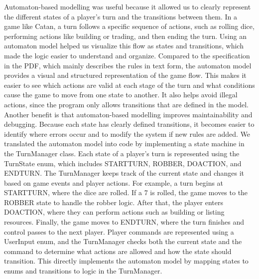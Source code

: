 Automaton-based modelling was useful because it allowed us to clearly represent the different states of a player’s turn and the transitions between them. In a game like Catan, a turn follows a specific sequence of actions, such as rolling dice, performing actions like building or trading, and then ending the turn. Using an automaton model helped us visualize this flow as states and transitions, which made the logic easier to understand and organize. Compared to the specification in the PDF, which mainly describes the rules in text form, the automaton model provides a visual and structured representation of the game flow. This makes it easier to see which actions are valid at each stage of the turn and what conditions cause the game to move from one state to another. It also helps avoid illegal actions, since the program only allows transitions that are defined in the model. \newline
\newline
Another benefit is that automaton-based modelling improves maintainability and debugging. Because each state has clearly defined transitions, it becomes easier to identify where errors occur and to modify the system if new rules are added. \newline
\newline
We translated the automaton model into code by implementing a state machine in the TurnManager class. Each state of a player's turn is represented using the TurnState enum, which includes STARTTURN, ROBBER, DOACTION, and ENDTURN. \newline
\newline
The TurnManager keeps track of the current state and changes it based on game events and player actions. For example, a turn begins at STARTTURN, where the dice are rolled. If a 7 is rolled, the game moves to the ROBBER state to handle the robber logic. After that, the player enters DOACTION, where they can perform actions such as building or listing resources. Finally, the game moves to ENDTURN, where the turn finishes and control passes to the next player. \newline
\newline
Player commands are represented using a UserInput enum, and the TurnManager checks both the current state and the command to determine what actions are allowed and how the state should transition. This directly implements the automaton model by mapping states to enums and transitions to logic in the TurnManager.\newline
\newline

